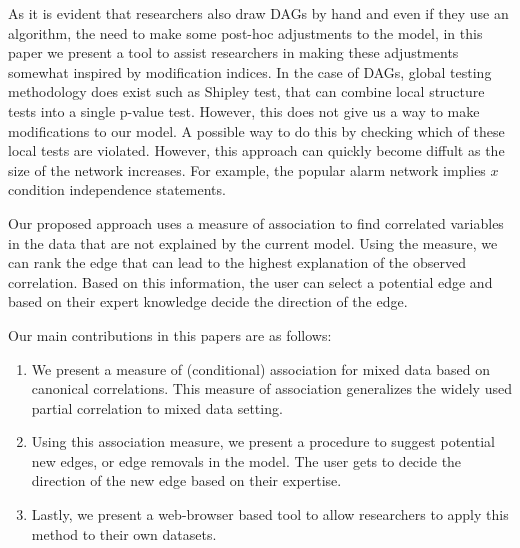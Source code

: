 \documentclass[letterpaper]{article} %
\begin{document}

As it is evident that researchers also draw DAGs by hand and even if they use
an algorithm, the need to make some post-hoc adjustments to the model, in this
paper we present a tool to assist researchers in making these adjustments
somewhat inspired by modification indices. In the case of DAGs, global testing
methodology does exist such as Shipley test, that can combine local structure
tests into a single p-value test. However, this does not give us a way to make
modifications to our model. A possible way to do this by checking which of
these local tests are violated. However, this approach can quickly become
diffult as the size of the network increases. For example, the popular alarm
network implies $x$ condition independence statements.


Our proposed approach uses a measure of association to find correlated variables
in the data that are not explained by the current model. Using the measure, we 
can rank the edge that can lead to the highest explanation of the observed 
correlation. Based on this information, the user can select a potential edge
and based on their expert knowledge decide the direction of the edge.


Our main contributions in this papers are as follows:
\begin{enumerate}
	\item We present a measure of (conditional) association for mixed data
		based on canonical correlations. This measure of association
		generalizes the widely used partial correlation to mixed data
		setting.
	\item Using this association measure, we present a procedure to suggest
		potential new edges, or edge removals in the model. The user
		gets to decide the direction of the new edge based on their
		expertise.
	\item Lastly, we present a web-browser based tool to allow researchers
		to apply this method to their own datasets.
\end{enumerate}
\end{document}
